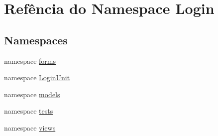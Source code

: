 \hypertarget{namespaceLogin}{\section{Refência do Namespace Login}
\label{dc/d54/namespaceLogin}
}
\subsection*{Namespaces}
\begin{DoxyCompactItemize}
\item 
namespace \hyperlink{namespaceLogin_1_1forms}{forms}
\item 
namespace \hyperlink{namespaceLogin_1_1LoginUnit}{Login\-Unit}
\item 
namespace \hyperlink{namespaceLogin_1_1models}{models}
\item 
namespace \hyperlink{namespaceLogin_1_1tests}{tests}
\item 
namespace \hyperlink{namespaceLogin_1_1views}{views}
\end{DoxyCompactItemize}
